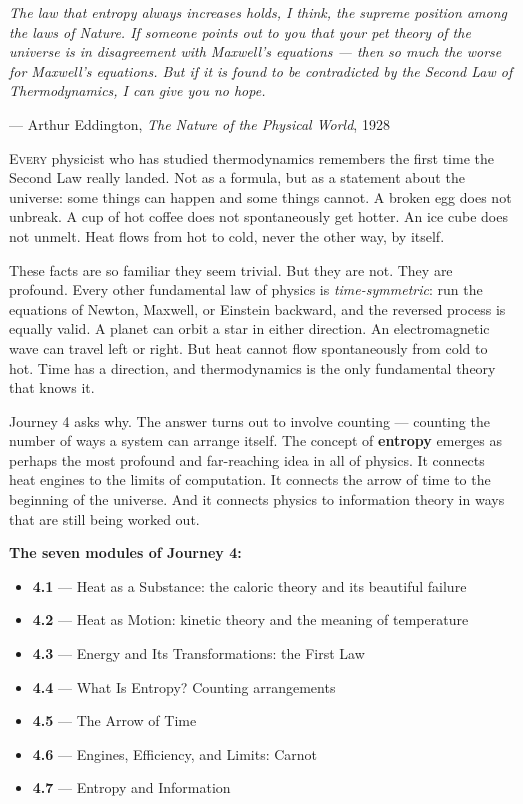 \documentclass[12pt, a4paper, twoside]{book}
\begin{document}
\epigraph{\itshape
  The law that entropy always increases holds, I think, the supreme
  position among the laws of Nature. If someone points out to you that
  your pet theory of the universe is in disagreement with Maxwell's equations
  --- then so much the worse for Maxwell's equations. But if it is found to
  be contradicted by the Second Law of Thermodynamics, I can give you no hope.
}{--- Arthur Eddington, \textit{The Nature of the Physical World}, 1928}

\lettrine[lines=3,loversize=0.08]{\textcolor{accent}{E}}{very} physicist who has studied thermodynamics remembers the first time the Second Law really landed. Not as a formula, but as a statement about the universe: some things can happen and some things cannot. A broken egg does not unbreak. A cup of hot coffee does not spontaneously get hotter. An ice cube does not unmelt. Heat flows from hot to cold, never the other way, by itself.

These facts are so familiar they seem trivial. But they are not. They are profound. Every other fundamental law of physics is \textit{time-symmetric}: run the equations of Newton, Maxwell, or Einstein backward, and the reversed process is equally valid. A planet can orbit a star in either direction. An electromagnetic wave can travel left or right. But heat cannot flow spontaneously from cold to hot. Time has a direction, and thermodynamics is the only fundamental theory that knows it.

Journey 4 asks why. The answer turns out to involve counting --- counting the number of ways a system can arrange itself. The concept of \textbf{entropy} emerges as perhaps the most profound and far-reaching idea in all of physics. It connects heat engines to the limits of computation. It connects the arrow of time to the beginning of the universe. And it connects physics to information theory in ways that are still being worked out.

\vspace{0.4cm}
\textbf{The seven modules of Journey 4:}
\begin{itemize}[leftmargin=2em,itemsep=2pt]
  \item \textbf{4.1} --- Heat as a Substance: the caloric theory and its beautiful failure
  \item \textbf{4.2} --- Heat as Motion: kinetic theory and the meaning of temperature
  \item \textbf{4.3} --- Energy and Its Transformations: the First Law
  \item \textbf{4.4} --- What Is Entropy? Counting arrangements
  \item \textbf{4.5} --- The Arrow of Time
  \item \textbf{4.6} --- Engines, Efficiency, and Limits: Carnot
  \item \textbf{4.7} --- Entropy and Information
\end{itemize}
\end{document}
